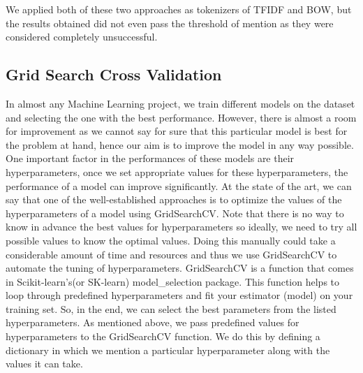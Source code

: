We applied both of these two approaches as tokenizers of TFIDF and BOW, but the results obtained did not even pass the threshold of mention as they were considered completely unsuccessful.

\subsection{Grid Search Cross Validation}
In almost any Machine Learning project, we train different models on the dataset and selecting the one with the best performance. However, there is almost a room for improvement as we cannot say for sure that this particular model is best for the problem at hand, hence our aim is to improve the model in any way possible. One important factor in the performances of these models are their hyperparameters, once we set appropriate values for these hyperparameters, the performance of a model can improve significantly. At the state of the art, we can say that one of the well-established approaches is to optimize the values of the hyperparameters of a model using GridSearchCV.
Note that there is no way to know in advance the best values for hyperparameters so ideally, we need to try all possible values to know the optimal values. Doing this manually could take a considerable amount of time and resources and thus we use GridSearchCV to automate the tuning of hyperparameters.
GridSearchCV is a function that comes in Scikit-learn’s(or SK-learn) model\_selection package. This function helps to loop through predefined hyperparameters and fit your estimator (model) on your training set. So, in the end, we can select the best parameters from the listed hyperparameters.
As mentioned above, we pass predefined values for hyperparameters to the GridSearchCV function. We do this by defining a dictionary in which we mention a particular hyperparameter along with the values it can take.

